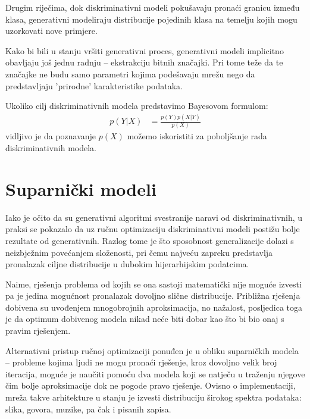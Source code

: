 \documentclass[lmodern, utf8, seminar]{fer}
\begin{document}
Drugim riječima, dok diskriminativni modeli pokušavaju pronaći granicu između klasa, generativni modeliraju distribucije pojedinih klasa na temelju kojih mogu uzorkovati nove primjere.
\newline


\newpage
Kako bi bili u stanju vršiti generativni proces, generativni modeli implicitno obavljaju još jednu radnju -- ekstrakciju bitnih značajki. Pri tome teže da te značajke ne budu samo parametri kojima podešavaju mrežu nego da predstavljaju 'prirodne' karakteristike podataka. 
\newline

Ukoliko cilj diskriminativnih modela predstavimo Bayesovom formulom:
\begin{equation}
\begin{split}
p(Y|X) &= \frac{p(Y)p(X|Y)}{p(X)}
\end{split}
\end{equation}
vidljivo je da poznavanje $p(X)$ možemo iskoristiti za poboljšanje rada diskriminativnih modela.

\newpage
\section{Suparnički modeli}
Iako je očito da su generativni algoritmi svestranije naravi od diskriminativnih, u praksi se pokazalo da uz ručnu optimizaciju diskriminativni modeli postižu bolje rezultate od generativnih. Razlog tome je što sposobnost generalizacije dolazi s neizbježnim povećanjem složenosti, pri čemu najveću zapreku predstavlja pronalazak ciljne distribucije u dubokim hijerarhijskim podatcima.

Naime, rješenja problema od kojih se ona sastoji matematički nije moguće izvesti \cite{goodfellow2014generative} pa je jedina mogućnost pronalazak dovoljno slične distribucije. Približna rješenja dobivena su uvođenjem mnogobrojnih aproksimacija, no nažalost, posljedica toga je da optimum dobivenog modela nikad neće biti dobar kao što bi bio onaj s pravim rješenjem.
\newline

Alternativni pristup ručnoj optimizaciji ponuđen je u obliku suparničkih modela -- probleme kojima ljudi ne mogu pronaći rješenje, kroz dovoljno velik broj iteracija, moguće je naučiti pomoću dva modela koji se natječu u traženju njegove čim bolje aproksimacije dok ne pogode pravo rješenje. Ovisno o implementaciji, mreža takve arhitekture u stanju je izvesti distribuciju širokog spektra podataka: slika, govora, muzike, pa čak i pisanih zapisa.
\newline
\end{document}
